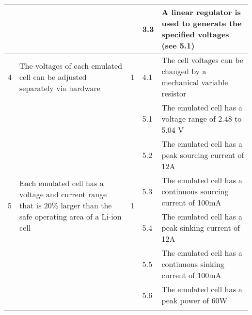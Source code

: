 \begin{longtable}{|l|p{2in}|p{0.8in}|l|p{2in}|}
                        &                                                                                                                                       &                             & 3.3  & A linear regulator is used to generate the specified voltages (see 5.1)                                   \\ \hline
    4                   & The voltages of each emulated cell can be adjusted separately via hardware                                                            & 1                           & 4.1  & The cell voltages can be changed by a mechanical variable resistor                                        \\ \hline
    \multirow{7}{*}{5}  & \multirow{7}{*}{Each emulated cell has a voltage and current range that is 20\% larger than the safe operating area of a Li-ion cell} & \multirow{7}{*}{1}          & 5.1  & The emulated cell has a voltage range of 2.48 to 5.04 V                                                   \\ \cline{4-5} 
                        &                                                                                                                                       &                             & 5.2  & The emulated cell has a peak sourcing current of 12A                                                      \\ \cline{4-5} 
                        &                                                                                                                                       &                             & 5.3  & The emulated cell has a continuous sourcing current of 100mA                                              \\ \cline{4-5} 
                        &                                                                                                                                       &                             & 5.4  & The emulated cell has a peak sinking current of 12A                                                       \\ \cline{4-5} 
                        &                                                                                                                                       &                             & 5.5  & The emulated cell has a continuous sinking current of 100mA                                               \\ \cline{4-5} 
                        &                                                                                                                                       &                             & 5.6  & The emulated cell has a peak power of 60W                                                                 \\ \cline{4-5} 

\end{longtable}
